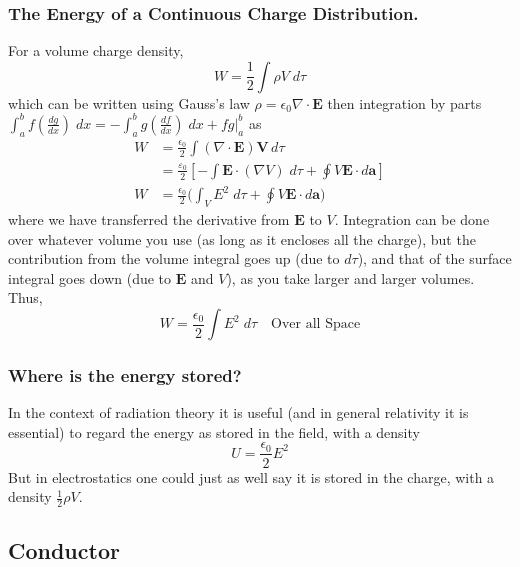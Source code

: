 \documentclass[../../../main.tex]{subfiles}
\begin{document}
\subsubsection{The Energy of a Continuous Charge Distribution.} For a volume charge density,
\begin{equation*}
    W=\frac{1}{2}\int\rho V\;d\tau
\end{equation*}
which can be written using Gauss's law $\rho=\epsilon_0 \nabla \cdot \mathbf{E}$ then integration by parts $    \int_{a}^{b} f(\frac{dg}{dx})\;dx=-\int_{a}^{b} g\left(\frac{df}{dx}\right)\;dx+ fg \lvert_{a}^{b}$ as
\begin{align*}
    W & =  \frac{\epsilon_0}{2} \int (\nabla \cdot \mathbf{E}) \mathbf{V} \, d\tau                                                  \\
      & = \frac{\varepsilon_0}{2} \left[ - \int \mathbf{E} \cdot (\nabla V)\; d\tau + \oint V \mathbf{E} \cdot d \mathbf{a} \right] \\
    W & = \frac{\epsilon_0}{2}\Biggl(\int_{V}E^2\;d\tau+ \oint V\mathbf{E}\cdot d\mathbf{a}\Biggr)
\end{align*}
where we have transferred the derivative from $\mathbf{E}$ to $V$.
Integration can be done over whatever volume you use (as long as it encloses all the charge), but the contribution from the volume integral goes up (due to $d\tau$), and that of the surface integral goes down (due to $\mathbf{E}$ and $V$), as you take larger and larger volumes.
Thus,
\begin{equation*}
    W=\frac{\epsilon_0}{2}\int E^2\;d\tau\quad\text{Over all Space}
\end{equation*}

\subsubsection{Where is the energy stored?} In the context of radiation theory it is useful (and in general relativity it is essential) to regard the energy as stored in the field, with a density
\begin{equation*}
    U=\frac{\epsilon_0 }{2}E^2
\end{equation*}
But in electrostatics one could just as well say it is stored in the charge, with a density $\frac{1}{2}\rho V$.

\subsection{Conductor}
\end{document}
